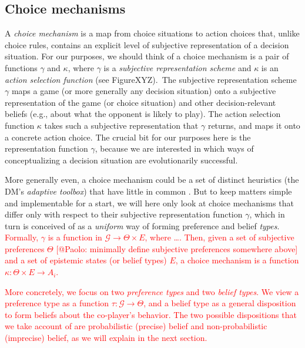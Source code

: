 \documentclass[fleqn,reqno,11pt]{article}
\begin{document}
\subsection{Choice mechanisms}
\label{sec:choice-mechanisms}

A \emph{choice mechanism} is a map from choice situations to action choices that, unlike choice
rules, contains an explicit level of subjective representation of a decision situation. For our
purposes, we should think of a choice mechanism is a pair of functions $\gamma$ and $\kappa$,
where $\gamma$ is a \emph{subjective representation scheme} and $\kappa$ is an \emph{action
  selection function} (see FigureXYZ).\ The subjective representation scheme $\gamma$ maps a game (or more generally any
decision situation) onto a subjective representation of the game (or choice situation) and
other decision-relevant beliefs (e.g., about what the opponent is likely to play). The action
selection function $\kappa$ takes such a subjective representation that $\gamma$ returns, and
maps it onto a concrete action choice. The crucial bit for our purposes here is the
representation function $\gamma$, because we are interested in which ways of conceptualizing a
decision situation are evolutionarily successful.

More generally even, a choice mechanism could be a set of distinct heuristics (the DM's
\emph{adaptive toolbox}) that have little in common
\citep[e.g.][]{TverskyKahnemann1981:The-Framing-of-,GigerenzerGoldstein1996:Reasoning-the-F,ScheibehenneRieskamp2013:Testing-the-Ada}. But
to keep matters simple and implementable for a start, we will here only look at choice
mechanisms that differ only with respect to their subjective representation function $\gamma$,
which in turn is conceived of as a \emph{uniform} way of forming preference and belief
\emph{types}. \textcolor{red}{Formally, $\gamma$ is a function in
  $\mathcal{G} \rightarrow \Theta \times E$, where \dots. Then, given a set of subjective
  preferences $ \Theta $ [@Paolo: minimally define subjective preferences somewhere above] and
  a set of epistemic states (or belief types) $E$, a choice mechanism is a function
  $\kappa: \Theta \times E \rightarrow A_i $.}

\textcolor{red}{More concretely, we focus on two \emph{preference types} and two \emph{belief
    types}. We view a preference type as a function $\tau: \mathcal{G} \rightarrow \Theta$, and
  a belief type as a general disposition to form beliefs about the co-player’s behavior. The
  two possible dispositions that we take account of are probabilistic (precise) belief and
  non-probabilistic (imprecise) belief, as we will explain in the next section.}
\end{document}
